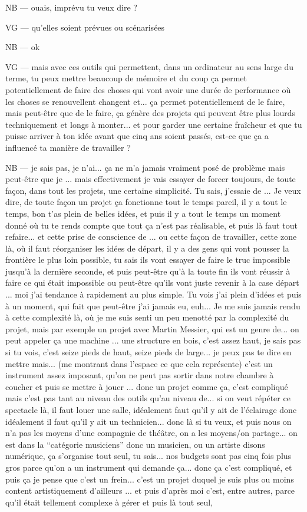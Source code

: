 NB — ouais, imprévu tu veux dire ?

VG — qu'elles soient prévues ou scénarisées 

NB — ok 

VG — mais avec ces outils qui permettent, dans un ordinateur au sens large du terme, tu peux mettre beaucoup de mémoire et du coup ça permet potentiellement de faire des choses qui vont avoir une durée de performance où les choses se renouvellent changent et... ça permet potentiellement de le faire, mais peut-être que de le faire, ça génère des projets qui peuvent être plus lourds techniquement et longs à monter... et pour garder une certaine fraîcheur et que tu puisse arriver à ton idée avant que cinq ans soient passés, est-ce que ça a influencé ta manière de travailler ?

NB —  je sais pas, je n'ai... ça ne m'a jamais vraiment posé de problème mais peut-être que je ...  mais effectivement je vais essayer de forcer toujours, de toute façon, dans tout les projets, une certaine simplicité. Tu sais, j'essaie de ... Je veux dire, de toute façon un projet ça fonctionne tout le temps pareil, il y a tout le temps, bon t'as plein de belles idées, et puis il y a tout le temps un moment donné où tu te rends compte que tout ça n'est pas réalisable, et puis là faut tout refaire... et cette prise de conscience de ... ou cette façon de travailler, cette zone là, où il faut réorganiser les idées de départ, il y a des gens qui vont pousser la frontière le plus loin possible, tu sais ils vont essayer de faire le truc impossible jusqu'à la dernière seconde, et puis peut-être qu'à la toute fin ils vont réussir à faire ce qui était impossible ou peut-être qu'ils vont juste revenir à la case départ ... moi j'ai tendance à rapidement au plus simple. Tu vois j'ai plein d'idées et puis à un moment, qui fait que peut-être j'ai jamais eu, euh... Je me suis jamais rendu à cette complexité là, où je me suis senti un peu menotté par la complexité du projet, mais par exemple un projet avec Martin Messier, qui est un genre de... on peut appeler ça une machine ... une structure en bois, c'est assez haut, je sais pas si tu vois, c'est seize pieds de haut, seize pieds de large... je peux pas te dire en mettre mais... (me montrant dans l'espace ce que cela représente) c'est un instrument assez imposant, qu'on ne peut pas sortir dans notre chambre à coucher et puis se mettre à jouer ... donc un projet comme ça, c'est compliqué mais c'est pas tant au niveau des outils qu'au niveau de... si on veut répéter ce spectacle là, il faut louer une salle, idéalement faut qu'il y ait de l'éclairage donc idéalement il faut qu'il y ait un technicien... donc là si tu veux, et puis nous on n'a pas les moyens d'une compagnie de théâtre, on a les moyens/on partage... on est dans la ``catégorie musiciens'' donc un musicien, ou un artiste disons numérique, ça s'organise tout seul, tu sais...  nos budgets sont pas cinq fois plus gros parce qu'on a un instrument qui demande ça... donc ça c'est compliqué, et puis ça je pense que c'est un frein... c'est un projet duquel je suis plus ou moins content artistiquement d'ailleurs ... et puis d'après moi c'est, entre autres, parce qu'il était tellement complexe à gérer et puis là tout seul, 
